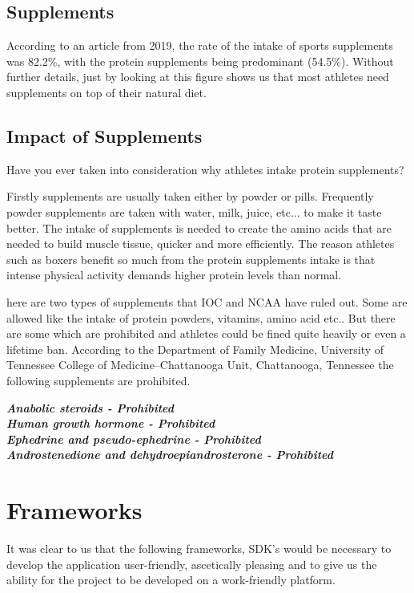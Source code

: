 \documentclass[a4paper,12pt]{report}
\begin{document}
\subsection{Supplements}
According to an article from 2019, the rate of the intake of sports supplements was 82.2\%, with the protein supplements being predominant (54.5\%). Without further details, just by looking at this figure shows us that most athletes need supplements on top of their natural diet.\cite{Supplements} 

\subsection{Impact of Supplements}
Have you ever taken into consideration why athletes intake protein supplements?

Firstly supplements are usually taken either by powder or pills. Frequently powder supplements are taken with water, milk, juice, etc... to make it taste better. The intake of supplements is needed to create the amino acids that are needed to build muscle tissue, quicker and more efficiently. The reason athletes such as boxers benefit so much from the protein supplements intake is that intense physical activity demands higher protein levels than normal.

here are two types of supplements that IOC and NCAA have ruled out. Some are allowed like the intake of protein powders, vitamins, amino acid etc.. But there are some which are prohibited and athletes could be fined quite heavily or even a lifetime ban. According to the Department of Family Medicine, University of Tennessee College of Medicine–Chattanooga Unit, Chattanooga, Tennessee the following supplements are prohibited. \cite{jenkinson2008supplements}

\textbf{\emph{Anabolic steroids - Prohibited\\ Human growth hormone - Prohibited\\Ephedrine and pseudo-ephedrine - Prohibited\\Androstenedione and dehydroepiandrosterone - Prohibited}} 


\section{Frameworks}
It was clear to us that the following frameworks, SDK's would be necessary to develop the application user-friendly, ascetically pleasing and to give us the ability for the project to be developed on a work-friendly platform.
\end{document}
